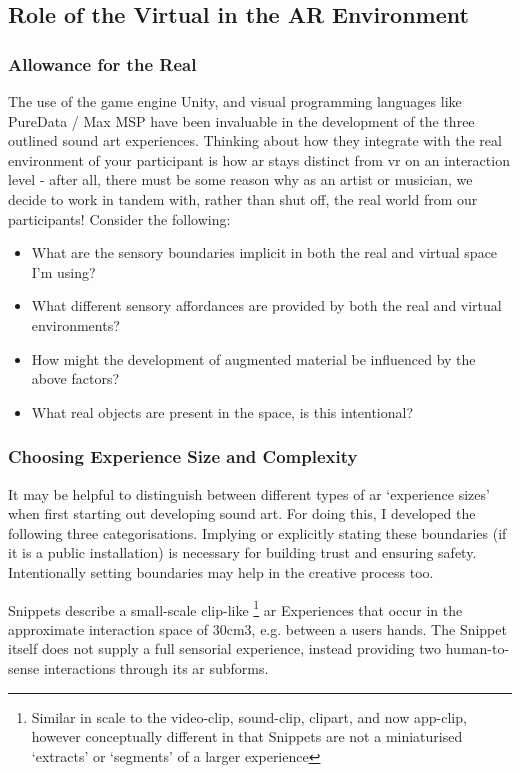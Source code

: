 \subsection{Role of the Virtual in the AR Environment}\label{sec: discussion-patterns-environment}
\subsubsection{Allowance for the Real}
The use of the game engine Unity, and visual programming languages like PureData / Max MSP have been invaluable in the development of the three outlined sound \gls{art} experiences. Thinking about how they integrate with the real environment of your participant is how \gls{ar} stays distinct from \gls{vr} on an interaction level - after all, there must be some reason why as an artist or musician, we decide to work in tandem with, rather than shut off, the real world from our participants! Consider the following:
\begin{itemize}
    \item What are the sensory boundaries implicit in both the real and virtual space I'm using? 
    \item What different sensory affordances are provided by both the real and virtual environments? 
    \item How might the development of augmented material be influenced by the above factors?
    \item What real objects are present in the space, is this intentional?
\end{itemize}

\subsubsection{Choosing Experience Size and Complexity}
It may be helpful to distinguish between different types of \gls{ar} `experience sizes' when first starting out developing sound \gls{art}. For doing this, I developed the following three categorisations. Implying or explicitly stating these boundaries (if it is a public installation) is necessary for building trust and ensuring safety. Intentionally setting boundaries may help in the creative process too.

Snippets describe a small-scale clip-like \footnote{Similar in scale to the video-clip, sound-clip, clipart, and now app-clip, however conceptually different in that Snippets are not a miniaturised `extracts' or `segments' of a larger experience} \gls{ar} Experiences that occur in the approximate interaction space of 30cm3, e.g. between a users hands. The Snippet itself does not supply a full sensorial experience, instead providing two human-to-sense interactions through its \gls{ar} subforms.

